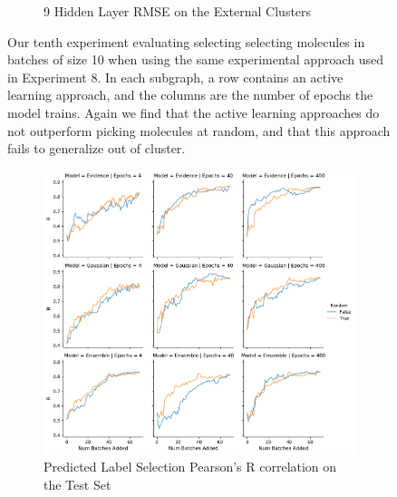 \documentclass[journal=jmcmar,manuscript=article]{achemso}
\begin{document}
\begin{figure}[tbph]
\begin{subfigure}[b]{0.48\textwidth}
        \caption{9 Hidden Layer RMSE on the External Clusters}
    \end{subfigure}
    \caption{Our tenth experiment evaluating selecting selecting molecules in batches of size 10 when using the same experimental approach used in Experiment 8. In each subgraph, a row contains an active learning approach, and the columns are the number of epochs the model trains. Again we find that the active learning approaches do not outperform picking molecules at random, and that this approach fails to generalize out of cluster.}
    \label{fig:batchingA}
\end{figure} 

\begin{figure}[tbph]
    \begin{subfigure}[b]{0.48\textwidth}
        \includegraphics[width=1\linewidth]{figures/fig10_morgan_bylabel_molbatch_R.pdf}
        \caption{Predicted Label Selection Pearson's R correlation on the Test Set}
    \end{subfigure}%
    \hfill
    \begin{subfigure}[b]{0.48\textwidth}

\end{subfigure}
\end{figure}
\end{document}
